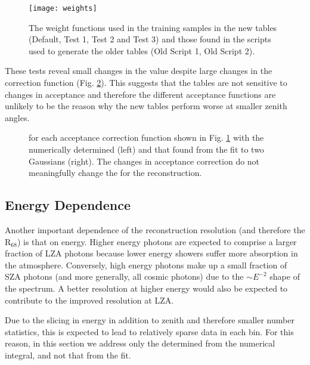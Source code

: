 \documentclass[main.tex]{subfiles}
\begin{document}
\begin{figure}[htbp]
  \centering
  \texttt{[image: weights]}
  \caption[Weight functions for offset from camera center.]{The weight functions used in the training samples in the new tables (Default, Test 1, Test 2 and Test 3) and those found in the scripts used to generate the older tables (Old Script 1, Old Script 2).}
  \label{fig:weights}
\end{figure}

These tests reveal small changes in the \rse value despite large changes in the correction function (Fig. \ref{fig:weight_tests}). This suggests that the \disp tables are not sensitive to changes in acceptance and therefore the different acceptance functions are unlikely to be the reason why the new \disp tables perform worse at smaller zenith angles.

\begin{figure}[H]
  \centering
  \caption[\rse for the acceptance correction functions.]{\rse for each acceptance correction function shown in Fig. \ref{fig:weights} with the numerically determined \rse (left) and that found from the fit to two Gaussians (right). The changes in acceptance correction do not meaningfully change the \rse for the reconstruction.}
  \label{fig:weight_tests}
\end{figure}

\subsection{Energy Dependence}
Another important dependence of the reconstruction resolution (and therefore the R$_{68}$) is that on energy. Higher energy photons are expected to comprise a larger fraction of LZA photons because lower energy showers suffer more absorption in the atmosphere. Conversely, high energy photons make up a small fraction of SZA photons (and more generally, all cosmic photons) due to the $\sim E^{-2}$ shape of the spectrum. A better resolution at higher energy would also be expected to contribute to the improved resolution at LZA.

Due to the slicing in energy in addition to zenith and therefore smaller number statistics, this is expected to lead to relatively sparse data in each bin. For this reason, in this section we address only the \rse determined from the numerical integral, and not that from the fit.
\end{document}
